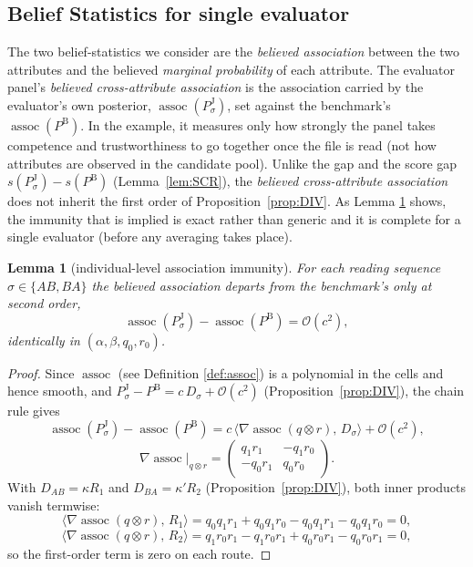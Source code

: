 \documentclass[a4paper,fleqn]{cas-sc}
\newtheorem{lemma}{Lemma}
\theoremstyle{remark}
\theoremstyle{definition}
\newcommand{\PB}{P^{\mathrm{B}}}
\newcommand{\PJ}{P^{\mathrm{J}}}
\newcommand{\assoc}{\operatorname{assoc}}
\newcommand{\bigO}{\mathcal{O}}
\begin{document}
\subsection{Belief Statistics for single evaluator}

The two belief-statistics we consider are the \emph{believed association} between the two attributes and the believed \emph{marginal probability} of each attribute. The evaluator panel's \emph{believed cross-attribute association} is the association carried by the evaluator's own posterior, $\assoc(\PJ_\sigma)$, set against the benchmark's $\assoc(\PB)$. In the example, it measures only how strongly the panel takes competence and trustworthiness to go together once the file is read (not how attributes are observed in the candidate pool). Unlike the gap and the score gap $s(\PJ_\sigma)-s(\PB)$ (Lemma~\ref{lem:SCR}), the \emph{believed cross-attribute association} does not inherit the first order of Proposition~\ref{prop:DIV}. As Lemma \ref{lem:ASC} shows, the immunity that is implied is exact rather than generic and it is complete for a single evaluator (before any
averaging takes place).

\renewcommand{\thelemma}{ASC}%
\begin{lemma}[individual-level association immunity]\label{lem:ASC}
For each reading sequence $\sigma\in\{AB,BA\}$ the believed association departs from the
benchmark's only at second order,
\[
  \assoc(\PJ_\sigma)-\assoc(\PB)=\bigO(c^{2}),
\]
identically in $(\alpha,\beta,q_{0},r_{0})$.
\end{lemma}

\begin{proof}
Since $\assoc$ (see Definition \ref{def:assoc}) is a polynomial in the cells and hence smooth, and
$\PJ_\sigma-\PB=c\,D_\sigma+\bigO(c^{2})$ (Proposition~\ref{prop:DIV}), the chain rule gives
\[
  \assoc(\PJ_\sigma)-\assoc(\PB)
   =c\,\big\langle\nabla\assoc(q\otimes r),\,D_\sigma\big\rangle+\bigO(c^{2}),
\]
\[
  \nabla\assoc\big|_{q\otimes r}
   =\begin{pmatrix}q_{1}r_{1} & -q_{1}r_{0}\\ -q_{0}r_{1} & q_{0}r_{0}\end{pmatrix}.
\]
With $D_{AB}=\kappa R_1$ and $D_{BA}=\kappa'R_2$ (Proposition~\ref{prop:DIV}), both inner
products vanish termwise:
\[
  \big\langle\nabla\assoc(q\otimes r),\,R_1\big\rangle
   = q_0q_1r_1 + q_0q_1r_0 - q_0q_1r_1 - q_0q_1r_0
   = 0,
\]
\[
  \big\langle\nabla\assoc(q\otimes r),\,R_2\big\rangle
   = q_1r_0r_1 - q_1r_0r_1 + q_0r_0r_1 - q_0r_0r_1
   = 0,
\]
so the first-order term is zero on each route.
\end{proof}
\end{document}
